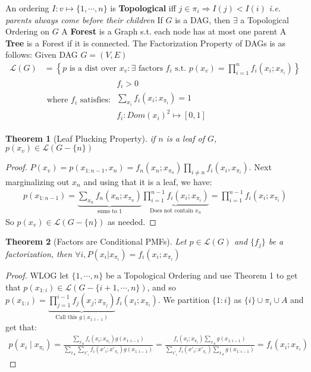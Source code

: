 \documentclass[]{article}
\theoremstyle{mattstyle}
\newtheorem{theorem}{Theorem}[section]
\theoremstyle{definition}
\begin{document}
An ordering \(I: v \mapsto \{1,\cdots,n\}\) is \textbf{Topological} iff \(j \in \pi_i \Rightarrow I(j) < I(i)\) \emph{i.e. parents always come before their children}
If \(G\) is a DAG, then \(\exists\) a Topological Ordering on \(G\)
A \textbf{Forest} is a Graph s.t. each node has at most one parent
A \textbf{Tree} is a Forest if it is connected. The Factorization Property of DAGs
is as follows: Given DAG \(G=(V,E)\)
\begin{align*}
\mathcal{L}(G)&=\left\{p \text{ is a dist over } x_v : 
\exists \text{ factors } f_i \text{ s.t. } p(x_v) = \prod_{i=1}^n f_i(x_i;x_{\pi_i})\right\}\\
&\text{ where $f_i$ satisfies: }\begin{array}{lll}
	f_i>0 \\
	\sum_{x_i}f_i(x_i; x_{\pi_i}) = 1 \\
	f_i: Dom(x_i)^2 \mapsto [0,1]
\end{array}
\end{align*}
\begin{theorem}[Leaf Plucking Property]
	if \(n\) is a leaf of \(G\), \(p(x_v)\in \mathcal{L}\left(G-\{n\}\right)\)
\end{theorem}
\begin{proof}
	$P(x_v)=p(x_{1:n-1},x_n)=f_n(x_n;x_{\pi_n})\prod_{i\ne n} f_i(x_i,x_{\pi_i})$. Next marginalizing out \(x_n\) and using that it is a leaf, we have:
	\begin{align*}p(x_{1:n-1})=\underbrace{\sum_{x_n}f_n(x_n;x_{\pi_n})}_{\text{sums to 1}}\underbrace{\prod_{i=1}^{n-1} f_i(x_i;x_{\pi_i})}_{\text{Does not contain } x_n} = \prod_{i=1}^{n-1} f_i(x_i;x_{\pi_i})
	\end{align*}
	So $p(x_v) \in \mathcal{L}\left(G-\{n\}\right)$ as needed.
\end{proof}
\begin{theorem}[Factors are Conditional PMFs]
	Let \(p \in \mathcal{L}(G)\) and $\{f_j\}$ be a factorization, then $\forall i, P(x_i | x_{\pi_i}) = f_i(x_i;x_{\pi_i})$
\end{theorem}
\begin{proof}
	WLOG let $\{1,\cdots,n\}$ be a Topological Ordering and use Theorem 1 to get that \(p(x_{1:i}) \in \mathcal{L}(G-\{i+1,\cdots,n\})\), and so \(p(x_{1:i})=\underbrace{\prod_{j=1}^{i-1} f_j(x_j;x_{\pi_j})}_{\text{Call this } g(x_{1:i-1})} f_i(x_i;x_{\pi_i})\). We partition \(\{1:i\}\) as \( \{i\}\cup \pi_i \cup A\) and get that:
	\begin{align*}
	p(x_i \mid x_{\pi_i})= \frac{\sum_{x_A}f_i(x_i;x_{\pi_i})g(x_{1:i-1})}{\sum_{x_A}\sum_{x'_i}f_i(x'_i;x'_{\pi_i})g(x_{1:i-1})}=\frac{f_i(x_i;x_{\pi_i})\sum_{x_A}g(x_{1:i-1})}{\sum_{x'_i}f_i(x'_i;x'_{\pi_i})\sum_{x_A}g(x_{1:i-1})}=f_i(x_i;x_{\pi_i})
	\end{align*}
\end{proof}
\end{document}
